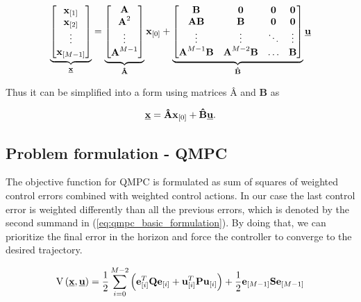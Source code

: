 \begin{equation}
\label{eq:prediction_big}
\underbrace{
\begin{bmatrix}
\textbf{x}_{[1]} \\
\textbf{x}_{[2]} \\
\vdots \\
\textbf{x}_{[M-1]} \\
\end{bmatrix}}_{\textbf{\underline{x}}}
=
\underbrace{
\begin{bmatrix}
\textbf{A} \\
\textbf{A}^2 \\
\vdots \\
\textbf{A}^{M-1} \\
\end{bmatrix}}_{\textbf{\^A}}
\textbf{x}_{[0]}
+
\underbrace{
\begin{bmatrix}
\textbf{B} & \textbf{0} & \textbf{0} & \textbf{0} \\
\textbf{AB} & \textbf{B} & \textbf{0} & \textbf{0} \\
\vdots & \vdots & \ddots & \vdots \\
\textbf{A}^{M-1}\textbf{B} & \textbf{A}^{M-2}\textbf{B} & \hdots & \textbf{B}
\end{bmatrix}
}_{\textbf{\^B}}\underline{\textbf{u}}
\end{equation}

Thus it can be simplified into a form using matrices $\textbf{\^A}$ and $\textbf{\^B}$ as

\begin{equation}
\textbf{\underline{x}} = \textbf{\^A}\textbf{x}_{[0]} + \textbf{\^B}\textbf{\underline{u}}.
\label{eq:prediction_final}
\end{equation}

\subsection{Problem formulation - QMPC}
\label{cap:mpc_formulation}

The objective function for QMPC is formulated as sum of squares of weighted control errors combined with weighted control actions. In our case the last control error is weighted differently than all the previous errors, which is denoted by the second summand in (\ref{eq:qmpc_basic_formulation}). By doing that, we can prioritize the final error in the horizon and force the controller to converge to the desired trajectory.

\begin{equation}
\label{eq:qmpc_basic_formulation}
\mathrm{V}\left(\textbf{\underline{x}}, \textbf{\underline{u}}\right) = \frac{1}{2}\sum_{i=0}^{M-2}\left(\textbf{e}^T_{[i]}\textbf{Q}\textbf{e}_{[i]} + \textbf{u}^T_{[i]}\textbf{P}\textbf{u}_{[i]}\right) + \frac{1}{2}\textbf{e}_{[M-1]}\textbf{S}\textbf{e}_{[M-1]}
\end{equation}

